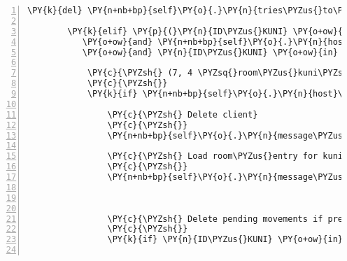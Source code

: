 \begin{Verbatim}[commandchars=\\\{\},numbers=left,firstnumber=1,stepnumber=1]
                    \PY{k}{del} \PY{n+nb+bp}{self}\PY{o}{.}\PY{n}{tries\PYZus{}to\PYZus{}move\PYZus{}dict}\PY{p}{[}\PY{n}{ID\PYZus{}KUNI}\PY{p}{]}

        \PY{k}{elif} \PY{p}{(}\PY{n}{ID\PYZus{}KUNI} \PY{o+ow}{in} \PY{n+nb+bp}{self}\PY{o}{.}\PY{n}{host}\PY{o}{.}\PY{n}{room\PYZus{}by\PYZus{}client}\PY{o}{.}\PY{n}{keys}\PY{p}{(}\PY{p}{)}
           \PY{o+ow}{and} \PY{n+nb+bp}{self}\PY{o}{.}\PY{n}{host}\PY{o}{.}\PY{n}{room\PYZus{}by\PYZus{}client}\PY{p}{[}\PY{n}{ID\PYZus{}KUNI}\PY{p}{]}\PY{o}{.}\PY{n}{identifier} \PY{o}{==} \PY{l+s}{\PYZdq{}}\PY{l+s}{room\PYZus{}kuni}\PY{l+s}{\PYZdq{}}
           \PY{o+ow}{and} \PY{n}{ID\PYZus{}KUNI} \PY{o+ow}{in} \PY{n+nb+bp}{self}\PY{o}{.}\PY{n}{host}\PY{o}{.}\PY{n}{room\PYZus{}by\PYZus{}client}\PY{p}{[}\PY{n}{ID\PYZus{}KUNI}\PY{p}{]}\PY{o}{.}\PY{n}{entity\PYZus{}locations}\PY{o}{.}\PY{n}{keys}\PY{p}{(}\PY{p}{)}\PY{p}{)}\PY{p}{:}

            \PY{c}{\PYZsh{} (7, 4 \PYZsq{}room\PYZus{}kuni\PYZsq{}) \PYZhy{}\PYZgt{} Teleports Kuni to \PYZsq{}room\PYZus{}entry\PYZsq{})}
            \PY{c}{\PYZsh{}}
            \PY{k}{if} \PY{n+nb+bp}{self}\PY{o}{.}\PY{n}{host}\PY{o}{.}\PY{n}{room\PYZus{}by\PYZus{}client}\PY{p}{[}\PY{n}{ID\PYZus{}KUNI}\PY{p}{]}\PY{o}{.}\PY{n}{entity\PYZus{}locations}\PY{p}{[}\PY{n}{ID\PYZus{}KUNI}\PY{p}{]} \PY{o}{==} \PY{p}{(}\PY{l+m+mi}{7}\PY{p}{,} \PY{l+m+mi}{4}\PY{p}{)}\PY{p}{:}

                \PY{c}{\PYZsh{} Delete client}
                \PY{c}{\PYZsh{}}
                \PY{n+nb+bp}{self}\PY{o}{.}\PY{n}{message\PYZus{}for\PYZus{}host}\PY{o}{.}\PY{n}{event\PYZus{}list}\PY{o}{.}\PY{n}{append}\PY{p}{(}\PY{n}{fabula}\PY{o}{.}\PY{n}{DeleteEvent}\PY{p}{(}\PY{n}{ID\PYZus{}KUNI}\PY{p}{)}\PY{p}{)}

                \PY{c}{\PYZsh{} Load room\PYZus{}entry for kuni and spawn kuni at position (1, 3)}
                \PY{c}{\PYZsh{}}
                \PY{n+nb+bp}{self}\PY{o}{.}\PY{n}{message\PYZus{}for\PYZus{}host}\PY{o}{.}\PY{n}{event\PYZus{}list}\PY{o}{.}\PY{n}{extend}\PY{p}{(}\PY{n+nb+bp}{self}\PY{o}{.}\PY{n}{\PYZus{}load\PYZus{}room}\PY{p}{(}\PY{n}{ID\PYZus{}KUNI}\PY{p}{,}
                                                                        \PY{l+s}{\PYZdq{}}\PY{l+s}{room\PYZus{}entry}\PY{l+s}{\PYZdq{}}\PY{p}{,}
                                                                        \PY{p}{(}\PY{l+m+mi}{1}\PY{p}{,} \PY{l+m+mi}{3}\PY{p}{)}\PY{p}{)}\PY{p}{)}

                \PY{c}{\PYZsh{} Delete pending movements if present}
                \PY{c}{\PYZsh{}}
                \PY{k}{if} \PY{n}{ID\PYZus{}KUNI} \PY{o+ow}{in} \PY{n+nb+bp}{self}\PY{o}{.}\PY{n}{tries\PYZus{}to\PYZus{}move\PYZus{}dict}\PY{o}{.}\PY{n}{keys}\PY{p}{(}\PY{p}{)}\PY{p}{:}


\end{Verbatim}
